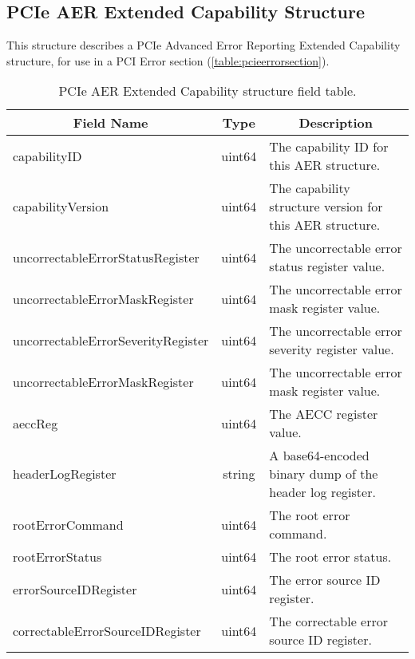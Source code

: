 \documentclass{report}
\newcommand*{\thead}[1]{\multicolumn{1}{|c|}{\bfseries #1}}
\newcommand*{\jsontable}[1]{
    \begin{table}[!ht]
    \label{#1}
    \centering
    \begin{adjustbox}{center}
    \begin{tabular}{|l|c|p{8cm}|}
    \hline
    \thead{Field Name} & \thead{Type} & \thead{Description} \\
    \hline
}
\newcommand*{\jsontableend}[1]{
    \hline
    \end{tabular}
    \end{adjustbox}
    \caption{#1}
    \label{table:#1}
    \end{table}
    \FloatBarrier
}
\begin{document}
\subsection{PCIe AER Extended Capability Structure}
\label{subsection:pcieaerecstructure}
This structure describes a PCIe Advanced Error Reporting Extended Capability structure, for use in a PCI Error section (\ref{table:pcieerrorsection}).
\jsontable{table:pcieaerecstructure}
capabilityID & uint64 & The capability ID for this AER structure.\\
\hline
capabilityVersion & uint64 & The capability structure version for this AER structure.\\
\hline
uncorrectableErrorStatusRegister & uint64 & The uncorrectable error status register value.\\
\hline
uncorrectableErrorMaskRegister & uint64 & The uncorrectable error mask register value.\\
\hline
uncorrectableErrorSeverityRegister & uint64 & The uncorrectable error severity register value.\\
\hline
uncorrectableErrorMaskRegister & uint64 & The uncorrectable error mask register value.\\
\hline
aeccReg & uint64 & The AECC register value.\\
\hline
headerLogRegister & string & A base64-encoded binary dump of the header log register.\\
\hline
rootErrorCommand & uint64 & The root error command.\\
\hline
rootErrorStatus & uint64 & The root error status.\\
\hline
errorSourceIDRegister & uint64 & The error source ID register.\\
\hline
correctableErrorSourceIDRegister & uint64 & The correctable error source ID register.\\
\jsontableend{PCIe AER Extended Capability structure field table.}

\end{document}
